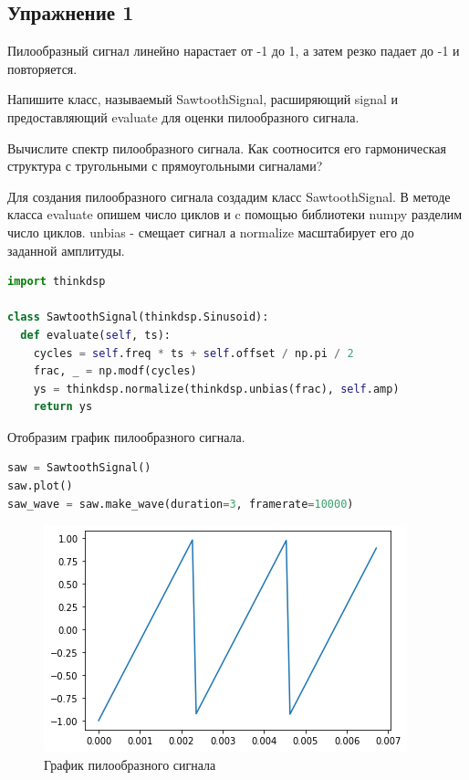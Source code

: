\subsection{Упражнение 1}

Пилообразный сигнал линейно нарастает от -1 до 1, а затем резко падает до -1 и повторяется.

\noindent Напишите класс, называемый SawtoothSignal, расширяющий signal и предоставляющий evaluate для оценки пилообразного сигнала.

\noindent Вычислите спектр пилообразного сигнала. Как соотносится его гармоническая структура с тругольными с прямоугольными сигналами?

Для создания пилообразного сигнала создадим класс SawtoothSignal. В методе класса evaluate опишем число циклов и c помощью библиотеки numpy разделим число циклов. unbias - смещает сигнал а normalize масштабирует его до заданной амплитуды.

\begin{lstlisting}[language=Python]
import thinkdsp

class SawtoothSignal(thinkdsp.Sinusoid):
  def evaluate(self, ts):
    cycles = self.freq * ts + self.offset / np.pi / 2
    frac, _ = np.modf(cycles)
    ys = thinkdsp.normalize(thinkdsp.unbias(frac), self.amp)
    return ys
\end{lstlisting}

\noindent Отобразим график пилообразного сигнала.

\begin{lstlisting}[language=Python]
saw = SawtoothSignal()
saw.plot()
saw_wave = saw.make_wave(duration=3, framerate=10000)
\end{lstlisting}

\begin{figure}[H]
	\begin{center}
		\includegraphics[scale=1]{fig/lab02/lab02_1.png}
		\caption{График пилообразного сигнала}
	\end{center}
\end{figure}

